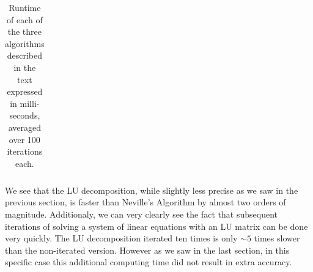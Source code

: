 \begin{table}[h]
    \centering
    \begin{tabular}{c|c}
        \hline
        
    \end{tabular}
    \caption{Runtime of each of the three algorithms described in the text expressed in milli-seconds, averaged over 100 iterations each.}
    \label{tab:vandermonde_timeit}
\end{table}

We see that the LU decomposition, while slightly less precise as we saw in the previous section, is faster than Neville's Algorithm by almost two orders of magnitude. Additionaly, we can very clearly see the fact that subsequent iterations of solving a system of linear equations with an LU matrix can be done very quickly. The LU decomposition iterated ten times is only $\sim 5$ times slower than the non-iterated version. However as we saw in the last section, in this specific case this additional computing time did not result in extra accuracy.


